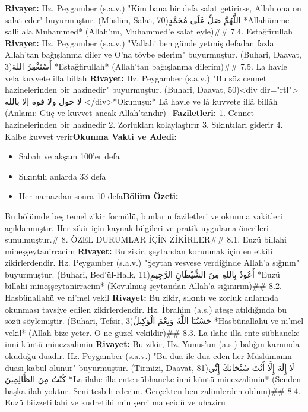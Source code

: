 \documentclass[12pt,a4paper]{article}
\begin{document}
{\textbf{Rivayet:} Hz. Peygamber (s.a.v.) "Kim bana bir defa salat getirirse, Allah ona on salat eder" buyurmuştur. (Müslim, Salat, 70)اللَّهُمَّ صَلِّ عَلَى مُحَمَّدٍ
*Allahümme salli ala Muhammed*
(Allah'ım, Muhammed'e salat eyle)\#\# 7.4. Estağfirullah
\textbf{Rivayet:} Hz. Peygamber (s.a.v.) "Vallahi ben günde yetmiş defadan fazla Allah'tan bağışlanma diler ve O'na tövbe ederim" buyurmuştur. (Buhari, Daavat, 3)أَسْتَغْفِرُ اللهَ
*Estağfirullah*
(Allah'tan bağışlanma dilerim)\#\# 7.5. La havle vela kuvvete illa billah
\textbf{Rivayet:} Hz. Peygamber (s.a.v.) "Bu söz cennet hazinelerinden bir hazinedir" buyurmuştur. (Buhari, Daavat, 50)<div dir="rtl">
لا حول ولا قوة إلا بالله
</div>*Okunuşu:* Lâ havle ve lâ kuvvete illâ billâh
}(Anlamı: Güç ve kuvvet ancak Allah'tandır)\_\textbf{Faziletleri:}
1. Cennet hazinelerinden bir hazinedir
2. Zorlukları kolaylaştırır
3. Sıkıntıları giderir
4. Kalbe kuvvet verir\textbf{Okunma Vakti ve Adedi:}
\begin{itemize}
\item Sabah ve akşam 100'er defa
\item Sıkıntılı anlarda 33 defa
\item Her namazdan sonra 10 defa\textbf{Bölüm Özeti:}
\end{itemize}
Bu bölümde beş temel zikir formülü, bunların faziletleri ve okunma vakitleri açıklanmıştır. Her zikir için kaynak bilgileri ve pratik uygulama önerileri sunulmuştur.\# 8. ÖZEL DURUMLAR İÇİN ZİKİRLER\#\# 8.1. Euzü billahi mineşşeytanirracim
\textbf{Rivayet:} Bu zikir, şeytandan korunmak için en etkili zikirlerdendir. Hz. Peygamber (s.a.v.) "Şeytan vesvese verdiğinde Allah'a sığının" buyurmuştur. (Buhari, Bed'ül-Halk, 11)أَعُوذُ بِاللهِ مِنَ الشَّيْطَانِ الرَّجِيمِ
*Euzü billahi mineşşeytanirracim*
(Kovulmuş şeytandan Allah'a sığınırım)\#\# 8.2. Hasbünallahü ve ni'mel vekil
\textbf{Rivayet:} Bu zikir, sıkıntı ve zorluk anlarında okunması tavsiye edilen zikirlerdendir. Hz. İbrahim (a.s.) ateşe atıldığında bu sözü söylemiştir. (Buhari, Tefsir, 3)حَسْبُنَا اللَّهُ وَنِعْمَ الْوَكِيلُ
*Hasbünallahü ve ni'mel vekil*
(Allah bize yeter. O ne güzel vekildir)\#\# 8.3. La ilahe illa ente sübhaneke inni küntü minezzalimin
\textbf{Rivayet:} Bu zikir, Hz. Yunus'un (a.s.) balığın karnında okuduğu duadır. Hz. Peygamber (s.a.v.) "Bu dua ile dua eden her Müslümanın duası kabul olunur" buyurmuştur. (Tirmizi, Daavat, 81)لَا إِلَهَ إِلَّا أَنْتَ سُبْحَانَكَ إِنِّي كُنْتُ مِنَ الظَّالِمِينَ
*La ilahe illa ente sübhaneke inni küntü minezzalimin*
(Senden başka ilah yoktur. Seni tesbih ederim. Gerçekten ben zalimlerden oldum)\#\# 8.4. Euzü biizzetillahi ve kudretihi min şerri ma ecidü ve uhaziru
\end{document}
